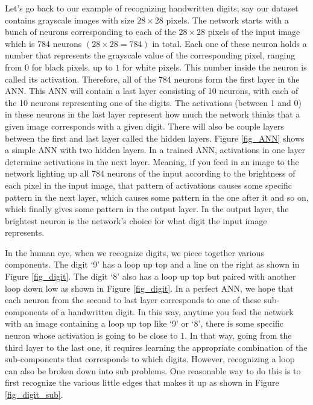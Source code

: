 \documentclass[master]{thesis-uestc}
\begin{document}
Let's go back to our example of recognizing handwritten digits; say our dataset contains grayscale images with size $28 \times 28$ pixels. The network starts with a bunch of neurons corresponding to each of the $28 \times 28$ pixels of the input image which is 784 neurons $(28 \times 28 = 784)$ in total. Each one of these neuron holds a number that represents the grayscale value of the corresponding pixel, ranging from $0$ for black pixels, up to $1$ for white pixels. This number inside the neuron is called its activation. Therefore, all of the 784 neurons form the first layer in the ANN. This ANN will contain a last layer consisting of 10 neurons, with each of the 10 neurons representing one of the digits. The activations (between 1 and 0) in these neurons in the last layer represent how much the network thinks that a given image corresponds with a given digit. There will also be couple layers between the first and last layer called the hidden layers. Figure \ref{fig_ANN} shows a simple ANN with two hidden layers. In a trained ANN, activations in one layer determine activations in the next layer. Meaning, if you feed in an image to the network lighting up all 784 neurons of the input according to the brightness of each pixel in the input image, that pattern of activations causes some specific pattern in the next layer, which causes some pattern in the one after it and so on, which finally gives some pattern in the output layer. In the output layer, the brightest neuron is the network's choice for what digit the input image represents.

In the human eye, when we recognize digits, we piece together various components. The digit `9' has a loop up top and a line on the right as shown in Figure \ref{fig_digit}. The digit `8' also has a loop up top but paired with another loop down low as shown in Figure \ref{fig_digit}. In a perfect ANN, we hope that each neuron from the second to last layer corresponds to one of these sub-components of a handwritten digit. In this way, anytime you feed the network with an image containing a loop up top like `9' or `8', there is some specific neuron whose activation is going to be close to $1$. In that way, going from the third layer to the last one, it requires learning the appropriate combination of the sub-components that corresponds to which digits. However, recognizing a loop can also be broken down into sub problems. One reasonable way to do this is to first recognize the various little edges that makes it up as shown in Figure \ref{fig_digit_sub}.
\end{document}
